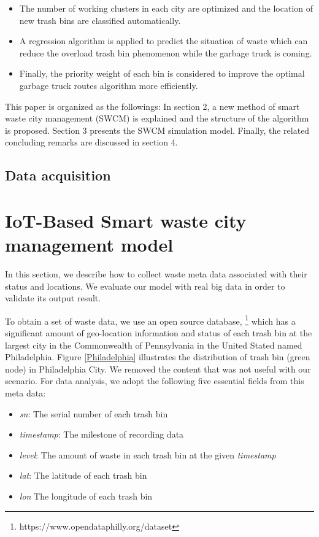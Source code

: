 \documentclass[conference,compsoc]{IEEEtran}
\begin{document}
\begin{itemize}
\item The number of working clusters in each city are optimized and the location of new trash bins are classified automatically. 

\item A regression algorithm is applied to predict the situation of waste which can reduce the overload trash bin phenomenon while the garbage truck is coming.

\item Finally, the priority weight of each bin is considered to improve the optimal garbage truck routes algorithm more efficiently.

\end{itemize}
\par This paper is organized as the followings: In section 2,  a new method of smart waste city management (SWCM) is explained and the structure of the algorithm is proposed. Section 3 presents the SWCM simulation model. Finally, the related concluding remarks are discussed in section 4.


\subsection{Data acquisition} 
\label{dataacquisition}

\section{IoT-Based Smart waste city management model}


In this section, we describe how to collect waste meta data associated with their status and locations. We evaluate our model with real big data in order to validate its output result.
\par To obtain a set of waste data, we use an open source database, \footnote{https://www.opendataphilly.org/dataset} which has a significant amount of geo-location information and status of each trash bin at the largest city in the Commonwealth of Pennsylvania in the United Stated named Philadelphia. Figure \ref{Philadelphia} illustrates the distribution of trash bin (green node) in Philadelphia City. We removed the content that was not useful with our scenario. For data analysis, we adopt the following five essential fields from this meta data:
\begin{itemize}
	\item \textit{sn}: The serial number of each trash bin
	\item \textit{timestamp}: The milestone of recording data
	\item \textit{level}: The amount of waste in each trash bin at the given \textit{timestamp}
	\item \textit{lat}: The latitude of each trash bin
	\item \textit{lon} The longitude of each trash bin
\end{itemize}
\end{document}
